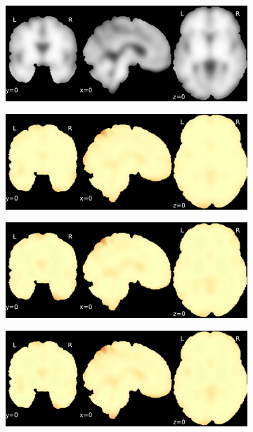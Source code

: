 \documentclass{article}
\begin{document}
\begin{appendices}
\begin{landscape}
\begin{figure}
            \begin{subfigure}[t]{0.2\paperheight}
                \centering
                \includegraphics[width=\textwidth]{figures/sig/15mm/ieee_ds002338_sub-xp207.pdf}
            \end{subfigure}
            \begin{subfigure}[t]{0.2\paperheight}
                \centering
                \includegraphics[width=\textwidth]{figures/sig/15mm/rr_ds002338_sub-xp207_sig.pdf}
            \end{subfigure}
            \begin{subfigure}[t]{0.2\paperheight}
                \centering
                \includegraphics[width=\textwidth]{figures/sig/15mm/rs_ds002338_sub-xp207_sig.pdf}
            \end{subfigure}
            \begin{subfigure}[t]{0.2\paperheight}
                \centering
                \includegraphics[width=\textwidth]{figures/sig/15mm/rr.rs_ds002338_sub-xp207_sig.pdf}

\end{subfigure}
\end{figure}
\end{landscape}
\end{appendices}
\end{document}
